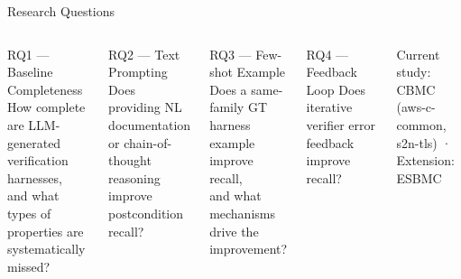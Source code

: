 \documentclass[aspectratio=169]{beamer}
\begin{document}
\begin{frame}{Research Questions}

\begin{columns}[T]

\begin{block}{RQ1 — Baseline Completeness}
{\small How complete are LLM-generated verification harnesses,\\
and what types of properties are systematically missed?}
\end{block}

\smallskip
\begin{block}{RQ2 — Text Prompting}
{\small Does providing NL documentation or chain-of-thought\\
reasoning improve postcondition recall?}
\end{block}

\begin{block}{RQ3 — Few-shot Example}
{\small Does a same-family GT harness example improve recall,\\
and what mechanisms drive the improvement?}
\end{block}

\smallskip
\begin{block}{RQ4 — Feedback Loop}
{\small Does iterative verifier error feedback improve recall?}
\end{block}

\smallskip
{\tiny\color{mygray}
Current study: CBMC (aws-c-common, s2n-tls) \quad·\quad
Extension: ESBMC}

\end{columns}

\end{frame}
\end{document}
